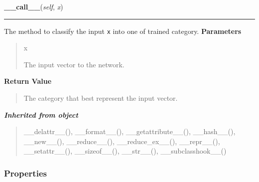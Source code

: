 \hspace{.8\funcindent}\begin{boxedminipage}{\funcwidth}

    \raggedright \textbf{\_\_call\_\_}(\textit{self}, \textit{x})

    \vspace{-1.5ex}

    \rule{\textwidth}{0.5\fboxrule}
\setlength{\parskip}{2ex}

The method to classify the input \texttt{x} into one of trained category.
\setlength{\parskip}{1ex}
      \textbf{Parameters}
      \vspace{-1ex}

      \begin{quote}
        \begin{Ventry}{x}

          \item[x]


The input vector to the network.
        \end{Ventry}

      \end{quote}

      \textbf{Return Value}
    \vspace{-1ex}

      \begin{quote}

The category that best represent the input vector.
      \end{quote}

    \end{boxedminipage}


\large{\textbf{\textit{Inherited from object}}}

\begin{quote}
\_\_delattr\_\_(), \_\_format\_\_(), \_\_getattribute\_\_(), \_\_hash\_\_(), \_\_new\_\_(), \_\_reduce\_\_(), \_\_reduce\_ex\_\_(), \_\_repr\_\_(), \_\_setattr\_\_(), \_\_sizeof\_\_(), \_\_str\_\_(), \_\_subclasshook\_\_()
\end{quote}


  \subsubsection{Properties}

